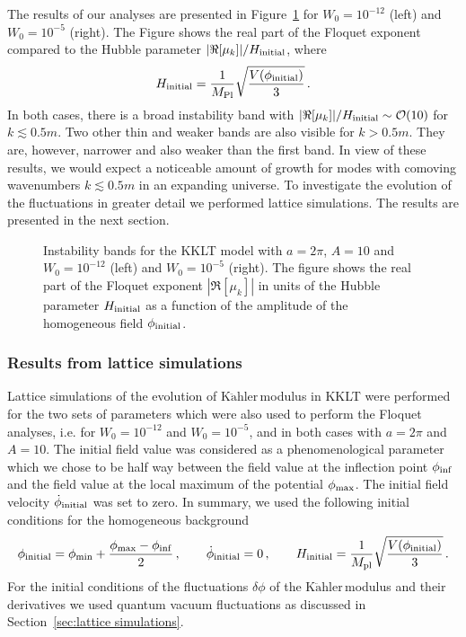 \documentclass[12pt]{article}
\newcommand{\be}{\begin{equation}}
\newcommand{\ee}{\end{equation}}
\newcommand{\Kahler}{\ensuremath{\text{K}\ddot{\text{a}}\text{hler}\,}}
\begin{document}
The results of our analyses are presented in Figure~\ref{fig:floquet_KKLT} for $W_0=10^{-12}$ (left) and $W_0=10^{-5}$ (right). The Figure shows the real part of the Floquet exponent compared to the Hubble parameter $|\Re[\mu_k]|/H_{\rm initial}$, where
\be
H_{\rm initial}=\frac{1}{M_{\rm Pl}}\sqrt{\frac{V(\phi_{\rm initial})}{3}}\,.
\ee
In both cases, there is a broad instability band with $|\Re[\mu_k]|/H_{\rm initial}\sim\mathcal{O}(10)$ for $k\lesssim0.5m$. Two other thin and weaker  bands are also visible for $k>0.5m$. They are, however, narrower and also weaker than the first band. In view of these results, we would expect a noticeable amount of growth for modes with comoving wavenumbers $k\lesssim0.5m$ in an expanding universe. To investigate the evolution of the fluctuations in greater detail we performed lattice simulations. The results are presented in the next section.

\begin{figure}
\centering
{}
\hfill
{}
\caption{Instability bands for the KKLT model with $a=2\pi$, $A=10$ and $W_0=10^{-12}$ (left) and $W_0=10^{-5}$ (right). The figure shows the real part of the Floquet exponent $|\Re[\mu_k]|$ in units of the Hubble parameter $H_{\rm initial}$ as a function of the amplitude of the homogeneous field $\phi_{\rm initial}$.}
\label{fig:floquet_KKLT}
\end{figure}


\subsubsection{Results from lattice simulations}
\label{sec:KKLT_lattice simulations}
Lattice simulations of the evolution of \Kahler modulus in KKLT were performed for the two sets of parameters which were also used to perform the Floquet analyses, i.e. for $W_0=10^{-12}$ and $W_0=10^{-5}$, and in both cases with $a=2\pi$ and $A=10$. The initial field value was considered as a phenomenological parameter which we chose to be half way between the field value at the inflection point $\phi_{\rm inf}$ and the field value at the local maximum of the potential $\phi_{\rm max}$. The initial field velocity $\dot{\phi}_{\rm initial}$ was set to zero. In summary, we used the following initial conditions for the homogeneous background
\be
\phi_{\rm initial}=\phi_{\rm min} + \frac{\phi_{\rm max}-\phi_{\rm inf}}{2}\,,\qquad \dot{\phi}_{\rm initial}=0\,,\qquad H_{\rm initial}=\frac{1}{M_{\rm pl}}\sqrt{\frac{V(\phi_{\rm initial})}{3}}\,.
\ee
For the initial conditions of the fluctuations $\delta\phi$ of the \Kahler modulus and their derivatives we used quantum vacuum fluctuations as discussed in Section~\ref{sec:lattice simulations}.
\end{document}
